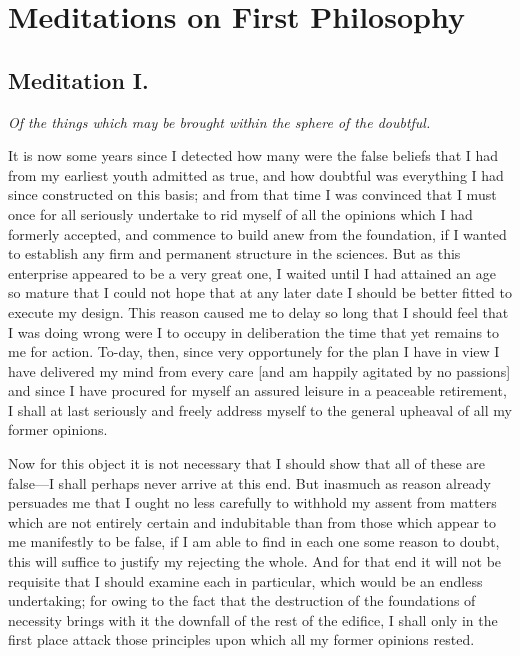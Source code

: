 
\author{Ren\'e Descartes}
\chapter[Meditations on First Philosophy, 1 and 2]{Meditations on
First Philosophy}

\section*{Meditation I.}

\begin{center}\textit{Of the things which may be brought within the
sphere of the doubtful.}\end{center}

\noindent It is now some years since I detected how many were the
false beliefs that I had from my earliest youth admitted as true, and
how doubtful was everything I had since constructed on this basis; and
from that time I was convinced that I must once for all seriously
undertake to rid myself of all the opinions which I had formerly
accepted, and commence to build anew from the foundation, if I wanted
to establish any firm and permanent structure in the sciences. But as
this enterprise appeared to be a very great one, I waited until I had
attained an age so mature that I could not hope that at any later date
I should be better fitted to execute my design. This reason caused me
to delay so long that I should feel that I was doing wrong were I to
occupy in deliberation the time that yet remains to me for action.
To-day, then, since very opportunely for the plan I have in view I
have delivered my mind from every care [and am happily agitated by no
passions] and since I have procured for myself an assured leisure in a
peaceable retirement, I shall at last seriously and freely address
myself to the general upheaval of all my former opinions.

Now for this object it is not necessary that I should show
that all of these are false---I shall perhaps never arrive at this
end. But inasmuch as reason already persuades me that I ought no less
carefully to withhold my assent from matters which are not entirely
certain and indubitable than from those which appear to me
manifestly to be false, if I am able to find in each one some reason
to doubt, this will suffice to justify my rejecting the whole. And for
that end it will not be requisite that I should examine each in
particular, which would be an endless undertaking; for owing to the
fact that the destruction of the foundations of necessity brings with
it the downfall of the rest of the edifice, I shall only in the first
place attack those principles upon which all my former opinions
rested.

